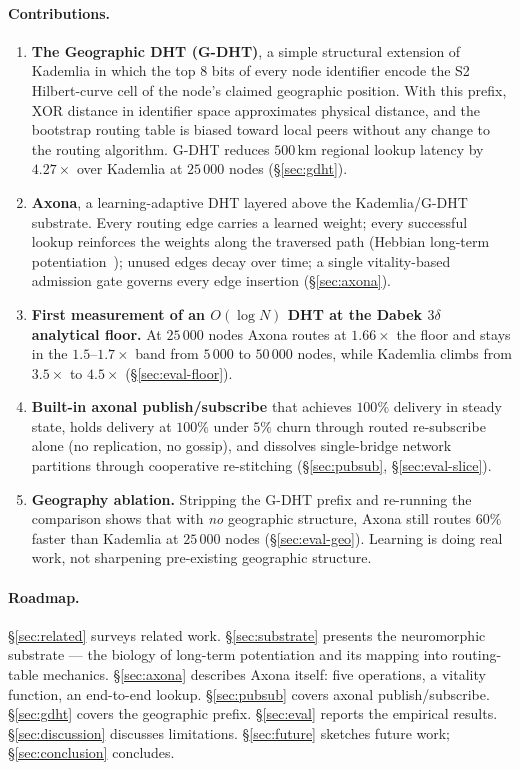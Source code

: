 \documentclass[conference]{IEEEtran}
\newcommand{\axona}{Axona\xspace}
\newcommand{\GDHT}{G-DHT\xspace}
\begin{document}
\paragraph{Contributions.}
\begin{enumerate}
\item \textbf{The Geographic DHT (\GDHT)}, a simple structural
extension of Kademlia in which the top $8$ bits of every node
identifier encode the S2 Hilbert-curve cell of the node's claimed
geographic position.  With this prefix, XOR distance in identifier
space approximates physical distance, and the bootstrap routing
table is biased toward local peers without any change to the
routing algorithm.  \GDHT reduces $500$\,km regional lookup
latency by $4.27\times$ over Kademlia at $25\,000$ nodes
(\S\ref{sec:gdht}).

\item \textbf{\axona}, a learning-adaptive DHT layered above the
Kademlia/\GDHT substrate.  Every routing edge carries a learned
weight; every successful lookup reinforces the weights along the
traversed path (Hebbian long-term
potentiation~\cite{hebb1949organization,bliss1973long}); unused
edges decay over time; a single vitality-based admission gate
governs every edge insertion (\S\ref{sec:axona}).

\item \textbf{First measurement of an $O(\log N)$ DHT at the
Dabek $3\delta$ analytical floor.}  At $25\,000$ nodes \axona
routes at $1.66\times$ the floor and stays in the
$1.5$--$1.7\times$ band from $5\,000$ to $50\,000$ nodes, while
Kademlia climbs from $3.5\times$ to $4.5\times$
(\S\ref{sec:eval-floor}).

\item \textbf{Built-in axonal publish/subscribe} that achieves
$100\%$ delivery in steady state, holds delivery at $100\%$ under
$5\%$ churn through routed re-subscribe alone (no replication, no
gossip), and dissolves single-bridge network partitions through
cooperative re-stitching (\S\ref{sec:pubsub},
\S\ref{sec:eval-slice}).

\item \textbf{Geography ablation.}  Stripping the \GDHT prefix
and re-running the comparison shows that with \emph{no}
geographic structure, \axona still routes $60\%$ faster than
Kademlia at $25\,000$ nodes (\S\ref{sec:eval-geo}).  Learning is
doing real work, not sharpening pre-existing geographic
structure.
\end{enumerate}

\paragraph{Roadmap.}
\S\ref{sec:related} surveys related work.  \S\ref{sec:substrate}
presents the neuromorphic substrate --- the biology of long-term
potentiation and its mapping into routing-table mechanics.
\S\ref{sec:axona} describes \axona itself: five operations, a
vitality function, an end-to-end lookup.  \S\ref{sec:pubsub}
covers axonal publish/subscribe.  \S\ref{sec:gdht} covers the
geographic prefix.  \S\ref{sec:eval} reports the empirical
results.  \S\ref{sec:discussion} discusses limitations.
\S\ref{sec:future} sketches future work; \S\ref{sec:conclusion}
concludes.
\end{document}
